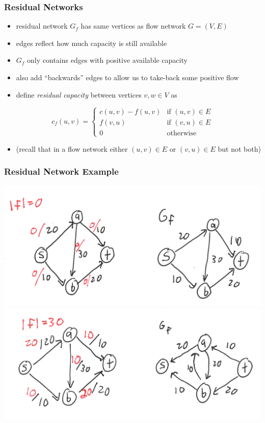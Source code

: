 \documentclass[10pt,aspectratio=169]{beamer}
\begin{document}
\begin{frame} \frametitle{Residual Networks}
\begin{itemize}
  \item residual network $G_f$ has same vertices as flow network $G=(V,E)$
  \item edges reflect how much capacity is still available
  \item $G_f$ only contains edges with positive available capacity
  \item also add ``backwards'' edges to allow us to take-back some positive flow
  \item define \emph{residual capacity} between vertices $v, w \in V$ as
\end{itemize}

  \[
      c_f(u, v) =
      \begin{cases}
        c(u, v) - f(u, v) & \text{if } (u, v) \in E \\
        f(v, u) & \text{if } (v, u) \in E \\
        0 & \text{otherwise}
      \end{cases}
  \]

\begin{itemize}
  \item (recall that in a flow network either $(u, v) \in E$ or $(v, u) \in E$
    but not both)
\end{itemize}
\end{frame}

\begin{frame} \frametitle{Residual Network Example}
  \begin{center}
    \includegraphics[scale=.6]{residual-1.png} \\

    \includegraphics[scale=.6]{residual-2.png}
  \end{center}
\end{frame}
\end{document}
